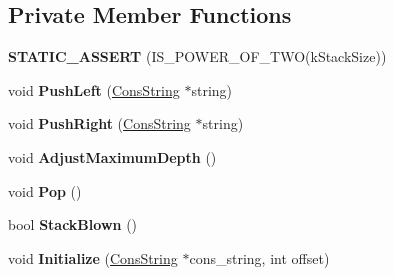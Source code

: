 \subsection*{Private Member Functions}
\begin{DoxyCompactItemize}
\item 
{\bfseries S\+T\+A\+T\+I\+C\+\_\+\+A\+S\+S\+E\+RT} (I\+S\+\_\+\+P\+O\+W\+E\+R\+\_\+\+O\+F\+\_\+\+T\+WO(k\+Stack\+Size))\hypertarget{classv8_1_1internal_1_1_cons_string_iterator_ab34e6bca0f13520d875e953c990fdcc8}{}\label{classv8_1_1internal_1_1_cons_string_iterator_ab34e6bca0f13520d875e953c990fdcc8}

\item 
void {\bfseries Push\+Left} (\hyperlink{classv8_1_1internal_1_1_cons_string}{Cons\+String} $\ast$string)\hypertarget{classv8_1_1internal_1_1_cons_string_iterator_aadbced09d93a2e147773298cfc4726a2}{}\label{classv8_1_1internal_1_1_cons_string_iterator_aadbced09d93a2e147773298cfc4726a2}

\item 
void {\bfseries Push\+Right} (\hyperlink{classv8_1_1internal_1_1_cons_string}{Cons\+String} $\ast$string)\hypertarget{classv8_1_1internal_1_1_cons_string_iterator_a3fb9f95ebd90d64ba80d75f55538ceeb}{}\label{classv8_1_1internal_1_1_cons_string_iterator_a3fb9f95ebd90d64ba80d75f55538ceeb}

\item 
void {\bfseries Adjust\+Maximum\+Depth} ()\hypertarget{classv8_1_1internal_1_1_cons_string_iterator_a47760d49a3c963cbf8dff11af801382f}{}\label{classv8_1_1internal_1_1_cons_string_iterator_a47760d49a3c963cbf8dff11af801382f}

\item 
void {\bfseries Pop} ()\hypertarget{classv8_1_1internal_1_1_cons_string_iterator_a353946172bcf176bf89142a04d2d1af5}{}\label{classv8_1_1internal_1_1_cons_string_iterator_a353946172bcf176bf89142a04d2d1af5}

\item 
bool {\bfseries Stack\+Blown} ()\hypertarget{classv8_1_1internal_1_1_cons_string_iterator_a3c721d9e9a61f8114bf1d89496ed4068}{}\label{classv8_1_1internal_1_1_cons_string_iterator_a3c721d9e9a61f8114bf1d89496ed4068}

\item 
void {\bfseries Initialize} (\hyperlink{classv8_1_1internal_1_1_cons_string}{Cons\+String} $\ast$cons\+\_\+string, int offset)\hypertarget{classv8_1_1internal_1_1_cons_string_iterator_a1329bfe6c3d2917f78b84eda40734b87}{}\label{classv8_1_1internal_1_1_cons_string_iterator_a1329bfe6c3d2917f78b84eda40734b87}


\end{DoxyCompactItemize}
